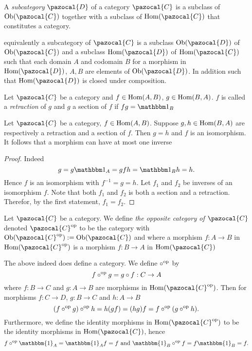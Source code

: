 \begin{definition}
    A \textit{subcategory} $\pazocal{D}$ of a category $\pazocal{C}$ is a subclass of $\Ob(\pazocal{C})$ together with a subclass of $\Hom(\pazocal{C})$ that constitutes a category.
\end{definition}
\begin{remark}
    equivalently a subcategory of $\pazocal{C}$ is a subclass $\Ob(\pazocal{D})$ of $\Ob(\pazocal{C})$ and a subclass $\Hom(\pazocal{D})$ of $\Hom(\pazocal{C})$ such that each domain $A$ and codomain $B$ for a morphism in $\Hom(\pazocal{D})$, $A,B$ are elements of $\Ob(\pazocal{D})$. In addition such that $\Hom(\pazocal{D})$ is closed under composition. 
\end{remark}
\begin{definition}
    Let $\pazocal{C}$ be a category and $f\in \mathrm{Hom}(A,B)$, $g\in \mathrm{Hom}(B,A)$.  $f$ is called a \textit{retraction} of $g$ and $g$ a section of $f$ if $fg = \fone_B$   
\end{definition}
\begin{lemma}\label{AtMostOneIso}
    Let $\pazocal{C}$ be a category, $f\in \mathrm{Hom}(A,B)$. Suppose $g,h\in \mathrm{Hom}(B,A)$ are respectively a retraction and a section of $f$. Then $g=h$ and $f$ is an isomorphism. It follows that a morphism can have at most one inverse
\end{lemma}
\begin{proof}
    Indeed 
    $$g=g\fone_A = gfh=\fone_B h = h.$$
    Hence $f$ is an isomorphism with $f^{-1} = g=h$. Let $f_1$ and $f_2$ be inverses of an isomorphism $f$. Note that both $f_1$ and $f_2$ is both a section and a retraction. Therefor, by the first statement, $f_1=f_2$.   
\end{proof}
\begin{definition}
    Let $\pazocal{C}$ be a category. We define \textit{the opposite category of $\pazocal{C}$} denoted $\pazocal{C}\op$ to be the category with $\Ob(\pazocal{C}\op) := \Ob(\pazocal{C})$ and where a morphism $f : A \rightarrow B$ in $\Hom(\pazocal{C}\op)$ is a morphism $f : B\rightarrow A$ in $\Hom(\pazocal{C})$ 
\end{definition}
\begin{remark}
    The above indeed does define a category. We define $\circ^\mathrm{op}$ by 
    $$f \circ^\mathrm{op} g = g\circ f : C \rightarrow A$$
    where $f: B\rightarrow C$ and $g: A \rightarrow B$ are morphisms in $\Hom(\pazocal{C}\op)$. Then for morphisms $f: C\rightarrow D$, $g: B \rightarrow C$ and $h: A \rightarrow B$
    $$(f\circ^\mathrm{op} g)\circ^\mathrm{op} h = h(gf)=(hg)f = f\circ^\mathrm{op}(g\circ^\mathrm{op} h).$$
    Furthermore, we define the identity morphisms in $\Hom(\pazocal{C}\op)$ to be the identity morphisms in $\Hom(\pazocal{C})$, hence 
    $$f\circ\op \mathbbm{1}_A = \mathbbm{1}_Af = f \text{ and } \mathbbm{1}_B \circ\op f = f \mathbbm{1}_B = f.$$
\end{remark}

